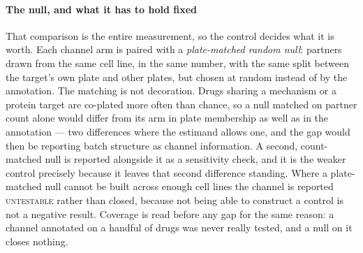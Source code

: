 \paragraph{The null, and what it has to hold fixed} That comparison is the entire
measurement, so the control decides what it is worth. Each channel arm is paired
with a \emph{plate-matched random null}: partners drawn from the same cell line,
in the same number, with the same split between the target's own plate and other
plates, but chosen at random instead of by the annotation. The matching is not
decoration. Drugs sharing a mechanism or a protein target are co-plated more often
than chance, so a null matched on partner count alone would differ from its arm in
plate membership as well as in the annotation --- two differences where the
estimand allows one, and the gap would then be reporting batch structure as
channel information. A second, count-matched null is reported alongside it as a
sensitivity check, and it is the weaker control precisely because it leaves that
second difference standing. Where a plate-matched null cannot be built across
enough cell lines the channel is reported \textsc{untestable} rather than closed,
because not being able to construct a control is not a negative result. Coverage
is read before any gap for the same reason: a channel annotated on a handful of
drugs was never really tested, and a null on it closes nothing.

